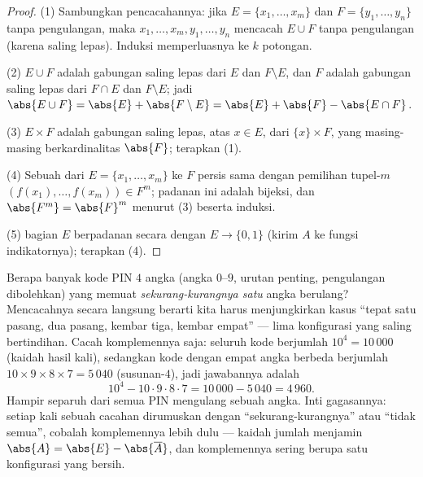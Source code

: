 \begin{proof}
(1) Sambungkan pencacahannya: jika $E = \{x_1, \dots, x_m\}$ dan $F =
\{y_1, \dots, y_n\}$ tanpa pengulangan, maka $x_1, \dots, x_m, y_1,
\dots, y_n$ mencacah $E \cup F$ tanpa pengulangan (karena saling lepas).
Induksi memperluasnya ke $k$ potongan.

(2) $E \cup F$ adalah gabungan saling lepas dari $E$ dan $F \setminus E$, dan
$F$ adalah gabungan saling lepas dari $F \cap E$ dan $F \setminus E$; jadi
$\abs{E \cup F} = \abs{E} + \abs{F \setminus E} = \abs{E} + \abs{F} -
\abs{E \cap F}$.

(3) $E \times F$ adalah gabungan saling lepas, atas $x \in E$, dari 
$\{x\} \times F$, yang masing-masing berkardinalitas $\abs{F}$; terapkan (1).

(4) Sebuah  dari $E = \{x_1, \dots, x_m\}$ ke $F$ persis sama dengan pemilihan
tupel-$m$ $(f(x_1), \dots, f(x_m)) \in F^m$; padanan
ini adalah bijeksi, dan $\abs{F^m} = \abs{F}^m$ menurut (3) beserta
induksi.

(5)  bagian $E$ berpadanan secara  dengan  $E \to \{0, 1\}$
(kirim $A$ ke fungsi indikatornya); terapkan (4).
\end{proof}

\begin{example}\label{ex:b1:counting:complement}
Berapa banyak kode PIN $4$ angka (angka $0$--$9$, urutan penting,
pengulangan dibolehkan) yang memuat \emph{sekurang-kurangnya satu} angka berulang?
Mencacahnya secara langsung berarti kita harus menjungkirkan kasus ``tepat satu pasang,
dua pasang, kembar tiga, kembar empat'' --- lima konfigurasi yang saling
bertindihan. Cacah komplemennya saja: seluruh kode berjumlah
$10^4 = 10\,000$ (kaidah hasil kali), sedangkan kode dengan empat angka berbeda
berjumlah $10 \times 9 \times 8 \times 7 = 5\,040$
(susunan-$4$), jadi jawabannya adalah
\[
10^4 - 10 \cdot 9 \cdot 8 \cdot 7 = 10\,000 - 5\,040 = 4\,960 .
\]
Hampir separuh dari semua PIN mengulang sebuah angka. Inti gagasannya:
setiap kali sebuah cacahan dirumuskan dengan ``sekurang-kurangnya'' atau
``tidak semua'', cobalah komplemennya lebih dulu --- kaidah jumlah menjamin
$\abs{A} = \abs{E} - \abs{\overline A}$, dan komplemennya
sering berupa satu konfigurasi yang bersih.
\end{example}

